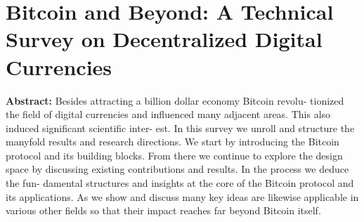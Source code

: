 \section{Bitcoin and Beyond: A Technical Survey on Decentralized Digital Currencies}

\textbf{Abstract:} 
Besides attracting a billion dollar economy  Bitcoin revolu- tionized the field of digital currencies and influenced many adjacent areas. This also induced significant scientific inter- est. In this survey  we unroll and structure the manyfold results and research directions. We start by introducing the Bitcoin protocol and its building blocks. From there we continue to explore the design space by discussing existing contributions and results. In the process  we deduce the fun- damental structures and insights at the core of the Bitcoin protocol and its applications. As we show and discuss  many key ideas are likewise applicable in various other fields  so that their impact reaches far beyond Bitcoin itself.
